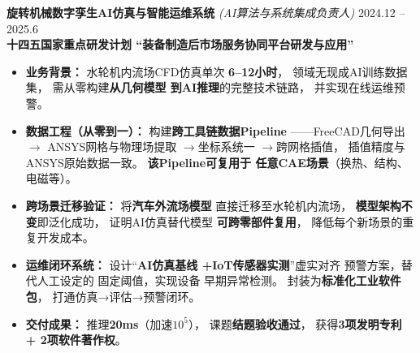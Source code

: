 \documentclass[11pt]{article}
\newlength{\interProjectSpacing}
\newcommand{\projectsep}{\vspace{\interProjectSpacing}}
\begin{document}
\projectsep
\textbf{旋转机械数字孪生AI仿真与智能运维系统} 
\textit{(AI算法与系统集成负责人)} 
\hfill 2024.12 -- 2025.6\\[0.2em]
\textcolor{CVBlue}{\textbf{十四五国家重点研发计划
``装备制造后市场服务协同平台研发与应用''}}
\begin{itemize}
    \item \textbf{业务背景：}
    水轮机内流场CFD仿真单次
    \textbf{6--12小时}，
    领域无现成AI训练数据集，
    需从零构建\textbf{从几何模型
    到AI推理}的完整技术链路，
    并实现在线运维预警。
    
    \item \textbf{数据工程（从零到一）：}
    构建\textbf{跨工具链数据Pipeline}
    ——FreeCAD几何导出$\rightarrow$
    ANSYS网格与物理场提取
    $\rightarrow$坐标系统一
    $\rightarrow$跨网格插值，
    插值精度与ANSYS原始数据一致。
    \textbf{该Pipeline可复用于
    任意CAE场景}（换热、结构、
    电磁等）。
    
    \item \textbf{跨场景迁移验证：}
    将\textbf{汽车外流场模型}
    直接迁移至水轮机内流场，
    \textbf{模型架构不变}即泛化成功，
    证明AI仿真替代模型
    \textbf{可跨零部件复用}，
    降低每个新场景的重复开发成本。
    
    \item \textbf{运维闭环系统：}
    设计``\textbf{AI仿真基线
    +IoT传感器实测}''虚实对齐
    预警方案，替代人工设定的
    固定阈值，实现设备
    早期异常检测。
    封装为\textbf{标准化工业软件包}，
    打通仿真→评估→预警闭环。
    
    \item \textbf{交付成果：}
    推理\textbf{20ms}（加速$10^5$），
    课题\textbf{结题验收通过}，
    获得\textbf{3项发明专利
    + 2项软件著作权}。
\end{itemize}


\projectsep
\end{document}
